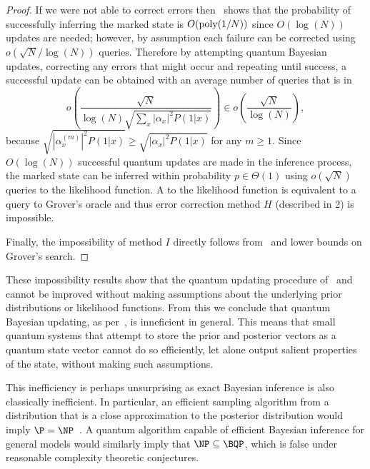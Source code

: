 \documentclass[aps,amsmath,onecolumn,amssymb,notitlepage]{revtex4-1}
\begin{document}
\begin{proof}
If we were not able to correct errors then~ shows that the probability of successfully inferring the marked state is $O({\rm poly}(1/N))$ since $O(\log(N))$ updates are needed; however, by assumption each failure can be corrected using $o(\sqrt{N}/\log(N))$ queries.  Therefore by attempting quantum Bayesian updates, correcting any errors that might occur and repeating until success, a successful update can be
obtained with an average number of queries that is in
\begin{equation}
o\left( \frac{\sqrt{N}}{\log(N)\sqrt{\sum_x |\alpha_x|^2 P(1|x)}}\right)\in o\left(\frac{\sqrt{N}}{\log(N)} \right),
\end{equation}
because $\sqrt{|\alpha_x^{(m)}|^2 P(1|x)}\ge \sqrt{|\alpha_x|^2 P(1|x)}$ for any $m\ge 1$.
Since $O(\log(N))$ successful quantum updates are made in the inference process, the marked state can be inferred within probability $p\in \Theta(1)$ using $o(\sqrt{N})$ queries to the likelihood function.  A
to the likelihood function is equivalent to a query to Grover's oracle and thus error correction method $H$ (described in 2) is impossible.

Finally, the impossibility of method $I$ directly follows from~ and lower bounds on Grover's search.
\end{proof}

These impossibility results show that the quantum updating procedure of~\cite{LYC14} and~ cannot be improved  without making assumptions about the underlying prior distributions or likelihood functions.  From this we conclude that quantum Bayesian updating, as per~, is inneficient in general.  This means that small quantum systems that attempt to store the prior and posterior vectors as a quantum state vector cannot do so efficiently, let alone output salient properties of the state, without making such assumptions.

This inefficiency is perhaps unsurprising as exact Bayesian inference is also classically inefficient.  In particular, an efficient sampling algorithm from a distribution that is a close approximation to the  posterior distribution would imply $\P=\NP$~\cite{dagum1993approximating}.  A quantum algorithm capable of efficient Bayesian inference for general models would similarly imply that $\NP \subseteq \BQP$, which is false under reasonable complexity theoretic conjectures.
\end{document}
